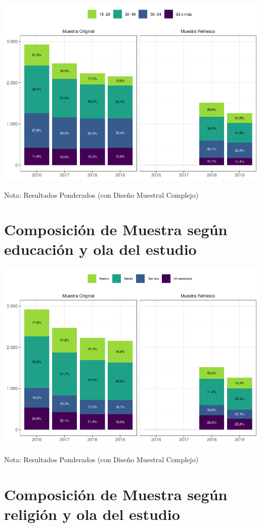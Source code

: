 \documentclass[
  12pt,
]{book}
\begin{document}
\begin{center}\includegraphics[width=0.75\linewidth]{concepto-medicion_files/figure-latex/unnamed-chunk-12-1} \end{center}

Nota: Resultados Ponderados (con Diseño Muestral Complejo)

\hypertarget{composiciuxf3n-de-muestra-seguxfan-educaciuxf3n-y-ola-del-estudio}{%
\section{Composición de Muestra según educación y ola del estudio}\label{composiciuxf3n-de-muestra-seguxfan-educaciuxf3n-y-ola-del-estudio}}

\begin{center}\includegraphics[width=0.75\linewidth]{concepto-medicion_files/figure-latex/unnamed-chunk-13-1} \end{center}

Nota: Resultados Ponderados (con Diseño Muestral Complejo)

\hypertarget{composiciuxf3n-de-muestra-seguxfan-religiuxf3n-y-ola-del-estudio}{%
\section{Composición de Muestra según religión y ola del estudio}\label{composiciuxf3n-de-muestra-seguxfan-religiuxf3n-y-ola-del-estudio}}
\end{document}
